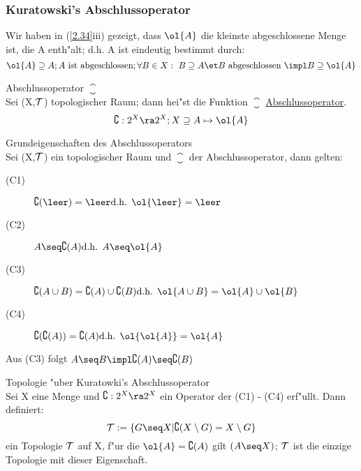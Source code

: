 \subsubsection{{\sc Kuratowski}'s Abschlussoperator}

Wir haben in (\ref{2.34}iii) gezeigt, dass $\ol{A}$ die kleinste abgeschlossene Menge ist, die A enth"alt; d.h. A ist eindeutig bestimmt durch:
\begin{equation}
\ol{A} \supseteq A; A\mbox{ ist abgeschlossen}; \forall B\in X: B\supseteq A\et B \mbox{ abgeschlossen } \impl B\supseteq\ol{A}\label{star2}
\end{equation}

\begin{definition}\label{2.37}{Abschlussoperator $\closure$}\\
Sei (X,$\mathcal T$) topologischer Raum; dann hei"st die Funktion $\closure$ \ul{Abschlussoperator}. $$\closure :2^X\ra 2^X ; X\supseteq A\mapsto\ol{A}$$
\end{definition}


\begin{satz}\label{2.38}{\sc Grundeigenschaften des Abschlussoperators}\\
Sei (X,$\mathcal T$) ein topologischer Raum und $\closure$ der Abschlussoperator, dann gelten:
\begin{description}
\item[(C1)] $\cl{\leer}=\leer\hfill \mbox{d.h. }\ol{\leer}=\leer$
\item[(C2)] $A\seq \cl{A}\hfill \mbox{d.h. } A\seq\ol{A}$
\item[(C3)] $\cl{A\cup B}=\cl{A}\cup\cl{B}\hfill \mbox{d.h. } \ol{A\cup B}=\ol{A}\cup\ol{B}$
\item[(C4)] $\cl{\cl{A}}=\cl{A}\hfill \mbox{d.h. } \ol{\ol{A}}=\ol{A}$
\end{description}
\end{satz}
\begin{bem}\label{2.39}{Aus (C3) folgt $A\seq B\impl \cl{A}\seq \cl{B}$}
\end{bem}
\begin{satz}\label{2.40}{\sc Topologie "uber Kuratowki's Abschlussoperator}\\
Sei X eine Menge und $\closure :2^X\ra 2^X$ ein Operator der (C1) - (C4) erf"ullt. Dann definiert:
$$\T:=\{ G\seq X| \cl{X\setminus G}=X\setminus G\}$$
ein Topologie $\mathcal T$ auf X, f"ur die $\ol{A} =\cl{A}$ gilt $(A\seq X)$; $\mathcal T$ ist die einzige Topologie mit dieser Eigenschaft.
\end{satz}


